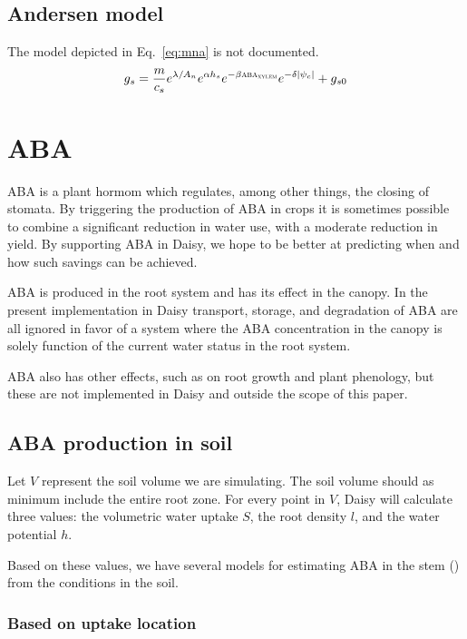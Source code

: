 \documentclass[a4paper,11pt,twoside]{article}
\newcommand{\aba}[1]{\text{\textsc{aba}$_\text{\textsc{#1}}$}}
\begin{document}
\subsection{Andersen model}

The model depicted in Eq.~\ref{eq:mna} is not documented.
\begin{equation}
  g_s = \frac{m}{c_s} e^{\lambda / A_n} e^{\alpha h_s} e^{-\beta
    \aba{xylem}} e^{-\delta |\psi_c|} + g_{s0}
  \label{eq:mna}
\end{equation}

\section{ABA}

ABA is a plant hormom which regulates, among other things, the closing
of stomata.  By triggering the production of ABA in crops it is
sometimes possible to combine a significant reduction in water use,
with a moderate reduction in yield.  By supporting ABA in Daisy, we
hope to be better at predicting when and how such savings can be
achieved.

ABA is produced in the root system and has its effect in the canopy.
In the present implementation in Daisy transport, storage, and
degradation of ABA are all ignored in favor of a system where the ABA
concentration in the canopy is solely function of the current water
status in the root system.

ABA also has other effects, such as on root growth and plant
phenology, but these are not implemented in Daisy and outside the
scope of this paper.

\subsection{ABA production in soil}

Let $V$ represent the soil volume we are simulating.  The soil volume
should as minimum include the entire root zone.  For every point in
$V$, Daisy will calculate three values: the volumetric water uptake
$S$, the root density $l$, and the water potential $h$.

Based on these values, we have several models for estimating ABA in
the stem (\aba{xylem}) from the conditions in the soil.

\subsubsection{Based on uptake location}
\end{document}
